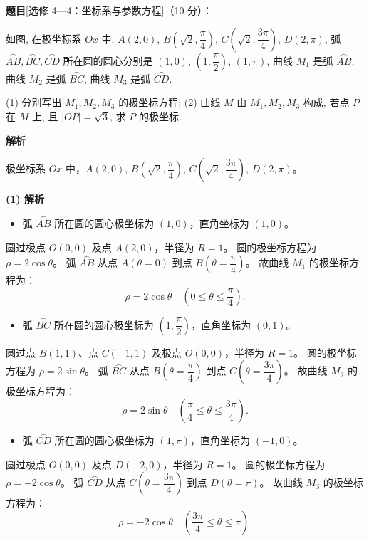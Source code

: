 \begin{answer}

\textbf{题目}[选修 4—4：坐标系与参数方程]（10 分）：

如图, 在极坐标系 $Ox$ 中, $A(2, 0)$, $B\left(\sqrt{2}, \dfrac{\pi}{4}\right)$, $C\left(\sqrt{2}, \dfrac{3\pi}{4}\right)$, $D(2, \pi)$, 弧 $\overset{\frown}{AB}, \overset{\frown}{BC}, \overset{\frown}{CD}$ 所在圆的圆心分别是 $(1, 0)$, $\left(1, \dfrac{\pi}{2}\right)$, $(1, \pi)$, 曲线 $M_1$ 是弧 $\overset{\frown}{AB}$, 曲线 $M_2$ 是弧 $\overset{\frown}{BC}$, 曲线 $M_3$ 是弧 $\overset{\frown}{CD}$.
\nopagebreak[4]
\begin{center}\end{center}
\nopagebreak[4]
(1) 分别写出 $M_1, M_2, M_3$ 的极坐标方程;  
(2) 曲线 $M$ 由 $M_1, M_2, M_3$ 构成, 若点 $P$ 在 $M$ 上, 且 $|OP| = \sqrt{3}$, 求 $P$ 的极坐标.

\textbf{解析}

极坐标系 $Ox$ 中，$A(2, 0)$, $B\left(\sqrt{2}, \dfrac{\pi}{4}\right)$, $C\left(\sqrt{2}, \dfrac{3\pi}{4}\right)$, $D(2, \pi)$。

\textbf{(1) 解析}
\begin{itemize}
\item 弧 $\overset{\frown}{AB}$ 所在圆的圆心极坐标为 $(1, 0)$，直角坐标为 $(1, 0)$。
\end{itemize}
  圆过极点 $O(0, 0)$ 及点 $A(2, 0)$，半径为 $R = 1$。
  圆的极坐标方程为 $\rho = 2\cos\theta$。
  弧 $\overset{\frown}{AB}$ 从点 $A(\theta = 0)$ 到点 $B\left(\theta = \dfrac{\pi}{4}\right)$。
  故曲线 $M_1$ 的极坐标方程为：
\nopagebreak[4]
\[\rho = 2\cos\theta \quad \left(0 \leqslant \theta \leqslant \frac{\pi}{4}\right).\]
\begin{itemize}
\item 弧 $\overset{\frown}{BC}$ 所在圆的圆心极坐标为 $\left(1, \dfrac{\pi}{2}\right)$，直角坐标为 $(0, 1)$。
\end{itemize}
  圆过点 $B(1, 1)$、点 $C(-1, 1)$ 及极点 $O(0, 0)$，半径为 $R = 1$。
  圆的极坐标方程为 $\rho = 2\sin\theta$。
  弧 $\overset{\frown}{BC}$ 从点 $B\left(\theta = \dfrac{\pi}{4}\right)$ 到点 $C\left(\theta = \dfrac{3\pi}{4}\right)$。
  故曲线 $M_2$ 的极坐标方程为：
\nopagebreak[4]
\[\rho = 2\sin\theta \quad \left(\frac{\pi}{4} \leqslant \theta \leqslant \frac{3\pi}{4}\right).\]
\begin{itemize}
\item 弧 $\overset{\frown}{CD}$ 所在圆的圆心极坐标为 $(1, \pi)$，直角坐标为 $(-1, 0)$。
\end{itemize}
  圆过极点 $O(0, 0)$ 及点 $D(-2, 0)$，半径为 $R = 1$。
  圆的极坐标方程为 $\rho = -2\cos\theta$。
  弧 $\overset{\frown}{CD}$ 从点 $C\left(\theta = \dfrac{3\pi}{4}\right)$ 到点 $D(\theta = \pi)$。
  故曲线 $M_3$ 的极坐标方程为：
\nopagebreak[4]
\[\rho = -2\cos\theta \quad \left(\frac{3\pi}{4} \leqslant \theta \leqslant \pi\right).\]


\end{answer}
